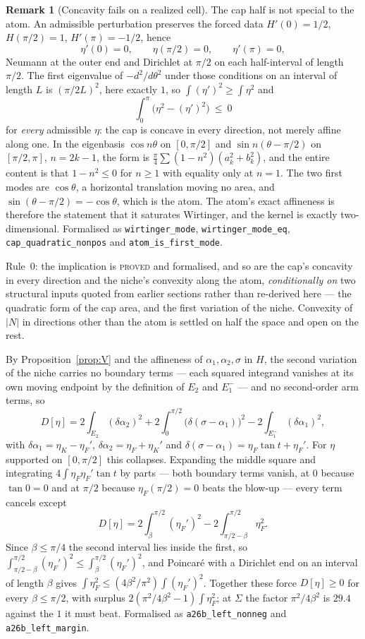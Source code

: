 \documentclass[11pt]{article}
\theoremstyle{definition}
\newtheorem{remark}[theorem]{Remark}
\newcommand{\Sig}{\Sigma}
\begin{document}
\begin{remark}[Concavity fails on a realized cell]
The cap half is not special to the atom. An admissible perturbation preserves the forced
data $H'(0)=1/2$, $H(\pi/2)=1$, $H'(\pi)=-1/2$, hence
\[
  \eta'(0)=0,\qquad \eta(\pi/2)=0,\qquad \eta'(\pi)=0 ,
\]
Neumann at the outer end and Dirichlet at $\pi/2$ on each half-interval of length $\pi/2$.
The first eigenvalue of $-d^2/d\theta^2$ under those conditions on an interval of length $L$
is $(\pi/2L)^2$, here exactly $1$, so $\int(\eta')^2\ge\int\eta^2$ and
\[
  \int_0^\pi\bigl(\eta^2-(\eta')^2\bigr)\ \le\ 0
\]
for \emph{every} admissible $\eta$: the cap is concave in every direction, not merely
affine along one. In the eigenbasis $\cos n\theta$ on $[0,\pi/2]$ and $\sin n(\theta-\pi/2)$
on $[\pi/2,\pi]$, $n=2k-1$, the form is $\tfrac\pi4\sum(1-n^2)(a_k^2+b_k^2)$, and the entire
content is that $1-n^2\le0$ for $n\ge1$ with equality only at $n=1$. The two first modes are
$\cos\theta$, a horizontal translation moving no area, and $\sin(\theta-\pi/2)=-\cos\theta$,
which is the atom. The atom's exact affineness is therefore the statement that it saturates
Wirtinger, and the kernel is exactly two-dimensional. Formalised as
\texttt{wirtinger\_mode}, \texttt{wirtinger\_mode\_eq}, \texttt{cap\_quadratic\_nonpos} and
\texttt{atom\_is\_first\_mode}.

Rule~0: the implication is \textsc{proved} and formalised, and so are the cap's concavity in
every direction and the niche's convexity along the atom, \emph{conditionally on} two
structural inputs quoted from earlier sections rather than re-derived here --- the quadratic
form of the cap area, and the first variation of the niche. Convexity of $|N|$ in directions
other than the atom is settled on half the space and open on the rest.

By Proposition~\ref{prop:V} and the affineness of $\alpha_1,\alpha_2,\sigma$ in $H$, the
second variation of the niche carries no boundary terms --- each squared integrand vanishes
at its own moving endpoint by the definition of $E_2$ and $E_1^-$ --- and no second-order
arm terms, so
\[
  D[\eta]=2\!\int_{E_2}\!(\delta\alpha_2)^2+2\!\int_0^{\pi/2}\!\bigl(\delta(\sigma-\alpha_1)\bigr)^2
   -2\!\int_{E_1^-}\!(\delta\alpha_1)^2 ,
\]
with $\delta\alpha_1=\eta_K-\eta_F'$, $\delta\alpha_2=\eta_F+\eta_K'$ and
$\delta(\sigma-\alpha_1)=\eta_F\tan t+\eta_F'$. For $\eta$ supported on $[0,\pi/2]$ this
collapses. Expanding the middle square and integrating $4\int\eta_F\eta_F'\tan t$ by parts
--- both boundary terms vanish, at $0$ because $\tan0=0$ and at $\pi/2$ because
$\eta_F(\pi/2)=0$ beats the blow-up --- every term cancels except
\[
  D[\eta]=2\!\int_\beta^{\pi/2}\!(\eta_F')^2-2\!\int_{\pi/2-\beta}^{\pi/2}\!\eta_F^2 .
\]
Since $\beta\le\pi/4$ the second interval lies inside the first, so
$\int_{\pi/2-\beta}^{\pi/2}(\eta_F')^2\le\int_\beta^{\pi/2}(\eta_F')^2$, and Poincar\'e with
a Dirichlet end on an interval of length $\beta$ gives
$\int\eta_F^2\le(4\beta^2/\pi^2)\int(\eta_F')^2$. Together these force $D[\eta]\ge0$ for
every $\beta\le\pi/2$, with surplus $2(\pi^2/4\beta^2-1)\int\eta_F^2$; at $\Sig$ the factor
$\pi^2/4\beta^2$ is $29.4$ against the $1$ it must beat. Formalised as
\texttt{a26b\_left\_nonneg} and \texttt{a26b\_left\_margin}.


\end{remark}
\end{document}
